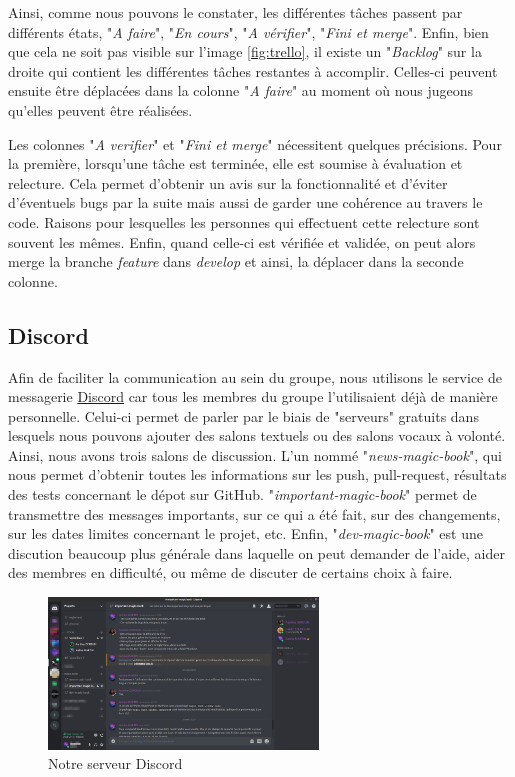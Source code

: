 			Ainsi, comme nous pouvons le constater, les différentes tâches passent par différents états, "\textit{A faire}", "\textit{En cours}", "\textit{A vérifier}", "\textit{Fini et merge}". Enfin, bien que cela ne soit pas visible sur l'image \ref{fig:trello}, il existe un "\textit{Backlog}" sur la droite qui contient les différentes tâches restantes à accomplir. Celles-ci peuvent ensuite être déplacées dans la colonne "\textit{A faire}" au moment où nous jugeons qu'elles peuvent être réalisées.

			Les colonnes "\textit{A verifier}" et "\textit{Fini et merge}" nécessitent quelques précisions. Pour la première, lorsqu'une tâche est terminée, elle est soumise à évaluation et relecture. Cela permet d'obtenir un avis sur la fonctionnalité et d'éviter d'éventuels bugs par la suite mais aussi de garder une cohérence au travers le code. Raisons pour lesquelles les personnes qui effectuent cette relecture sont souvent les mêmes. Enfin, quand celle-ci est vérifiée et validée, on peut alors merge la branche \textit{feature} dans \textit{develop} et ainsi, la déplacer dans la seconde colonne.

		\subsection{Discord}

			Afin de faciliter la communication au sein du groupe, nous utilisons le service de messagerie \href{https://discordapp.com}{Discord} car tous les membres du groupe l'utilisaient déjà de manière personnelle. Celui-ci permet de parler par le biais de "serveurs" gratuits dans lesquels nous pouvons ajouter des salons textuels ou des salons vocaux à volonté. Ainsi, nous avons trois salons de discussion. L'un nommé "\textit{news-magic-book}", qui nous permet d'obtenir toutes les informations sur les push, pull-request, résultats des tests concernant le dépot sur GitHub. "\textit{important-magic-book}" permet de transmettre des messages importants, sur ce qui a été fait, sur des changements, sur les dates limites concernant le projet, etc. Enfin, "\textit{dev-magic-book}" est une discution beaucoup plus générale dans laquelle on peut demander de l'aide, aider des membres en difficulté, ou même de discuter de certains choix à faire.

			\begin{figure}[H]
				\centering\includegraphics[width=0.64\textwidth, keepaspectratio]{img/discord.png}
				\caption{Notre serveur Discord}
			\end{figure}
